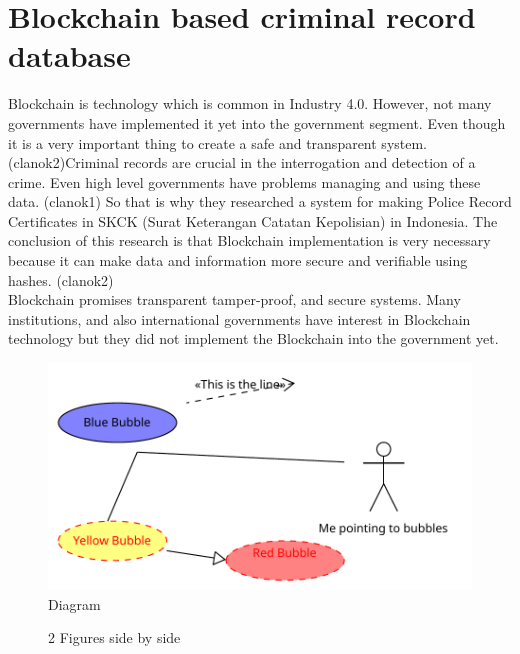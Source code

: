 \documentclass[10pt,english,a4paper]{article}
\begin{document}
\section{Blockchain based criminal record database}

Blockchain is technology which is common in Industry 4.0. However, not many governments have implemented it yet into the government segment. Even though it is a very important thing to create a safe and transparent system. \cite{Suroso:SKCK}(clanok2)Criminal records are crucial in the interrogation and detection of a crime. Even high level governments have problems managing and using these data. \cite{Jain:Criminal:record}(clanok1)  So that is why they researched a system for making Police Record Certificates in SKCK (Surat Keterangan Catatan Kepolisian) in Indonesia.  The conclusion of this research is that Blockchain implementation is very necessary because it can make data and information more secure and verifiable using hashes. \cite{Suroso:SKCK}(clanok2)
\\
Blockchain promises transparent tamper-proof, and secure systems. Many institutions, and also international governments have interest in Blockchain technology but they did not implement the Blockchain into the government yet.\cite{Suroso:SKCK} 
		

  \begin{figure}[h]
  \centering
   \includegraphics[scale=0.8]{Diagram_1.pdf}
  \centering
  \caption{Diagram}
 \end{figure}
 \lipsum[1-2]
 
 \begin{figure}%
    \centering
    \qquad
    \caption{2 Figures side by side}%
    \label{fig:example}%
\end{figure}
 
\end{document}
